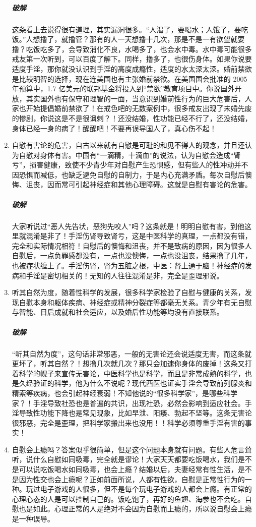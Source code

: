 \documentclass{ctexart}
\begin{document}
\begin{enumerate}
    \subparagraph{破解} 这条看上去说得很有道理，其实漏洞很多。“人渴了，要喝水；人饿了，要吃饭。”人想撸了，就撸管？那有的人一天想撸十几次，那是不是一有欲望就要撸？吃饭吃多了，会导致消化不良，水喝多了，也会水中毒。水中毒可能很多戒友第一次听到，可以百度了解下。同样，撸多了，也很伤身体。如果你说要适度手淫，那你就没认识到手淫的高度成瘾性，适度的水太深太深。婚前禁欲是比较明智的选择，现在连美国也有主张婚前禁欲。在美国国会批准的 2005 年预算中，1.7 亿美元的联邦基金将投入到“禁欲”教育项目中。你说国外开放，其实国外也有保守和理智的一面，当意识到婚前性行为的巨大危害后，人家也开始提倡婚前禁欲了！在戒色吧的无数案例中，很多戒友出现了未婚先废的惨剧，你说这是不是很讽刺？！还没结婚，性功能已经不行了，还没结婚，身体已经一身的病了！醒醒吧！不要再误导国人了，真心伤不起！
    \item 自慰有害论的危害，自古以来就有自慰是可耻的和见不得人的观念，并且还认为自慰对身体有害。中国有“一滴精，十滴血”的说法，认为自慰会造成“肾亏”，损害健康，致使不少青少年对自慰产生恐惧感，但有些人的性冲动并不因恐惧而减低，也缺乏避免自慰的自制力，于是内心充满矛盾。每次自慰后懊悔、沮丧，因而常可引起神经症和其他心理障碍。这就是自慰有害论的危害。
    \subparagraph{破解} 大家听说过“恶人先告状，恶狗先咬人”吗？这条就是！明明自慰有害，到他这里就混淆是非了！手淫伤肾导致肾亏，这是中医科学的真理，一点都没有错，完全和实际情况相符！自慰后的懊悔和沮丧，并不是致病的原因，因为很多人自慰后，一点负罪感都没有，一点也没懊悔，一点也没沮丧，结果撸了几年，也被症状缠上了。手淫伤肾，肾为五脏之根，中医：肾上通于脑！神经症的发病和手淫是密切相关的！无知的人往往混淆是非，完全是歪理邪说。
    \item 听其自然为度，随着性科学的发展，很多科学家检验了自慰与健康的关系，发现自慰本身和躯体疾病、神经症或精神分裂症等都毫无关系。青少年有无自慰与智能、日后成就和社会适应，以及婚后性功能等均没有直接联系。
    \subparagraph{破解} “听其自然为度”，这句话非常邪恶，一般的无害论还会说适度无害，而这条就更坏了，听其自然？！想撸几次就几次？那只会加速你身体的废掉！这条又打着科学的幌子来宣传无害论，中医科学也是科学，而且是非常成熟的科学，也是久经验证的科学，他为什么不说呢？现代西医也证实手淫会导致前列腺炎和精索等疾病，也会引起神经衰弱！不知他说的“很多科学家”，是哪些科学家？！手淫导致社恐也是普遍的共识，出现社恐，必然会影响到适应社会。手淫导致性功能下降也是常见现象，比如早泄、阳痿、勃起不坚等。这条无害论很邪恶，完全是歪理，把科学家搬出来也没用！！科学必须尊重手淫有害的事实！
    \item 自慰会上瘾吗？答案似乎很简单，但是这个问题本身就有问题。有些人危言耸听，说什么自慰如同吸毒，完全就是谬论！大家天天都要吃饭喝水，我们是不是可以说吃饭喝水如同吸毒，也会上瘾？结婚以后，夫妻经常有性生活，是不是因为性交也会上瘾呢？正如前面所说，人都有性欲，自慰是正常性行为的一种。玩过电子游戏的人很多，但不是每个玩电子游戏的人都会上瘾。有正常的心理心态的人是可以控制自己的。饭吃饱了，再好的鱼翅、海参也不会吃。自慰也是如此。心理正常的人是绝对不会因为自慰而上瘾的，所以说自慰会上瘾是一种误导。

\end{enumerate}
\end{document}
